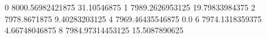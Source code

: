 0 8000.56982421875 31.10546875
1 7989.2626953125 19.79833984375
2 7978.8671875 9.40283203125
4 7969.46435546875 0.0
6 7974.1318359375 4.66748046875
8 7984.97314453125 15.5087890625
